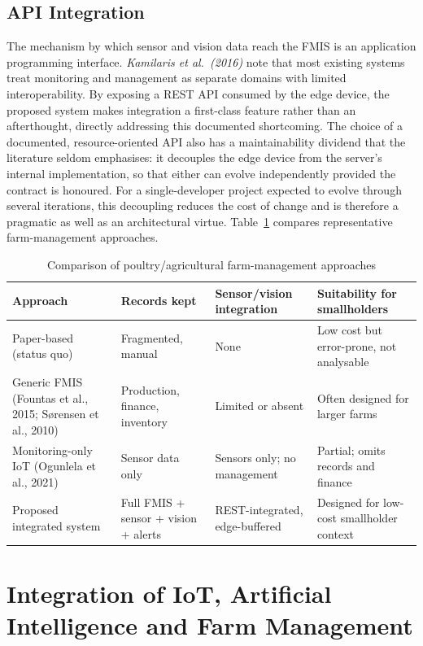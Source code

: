 \documentclass[12pt,a4paper]{report}
\begin{document}
\subsection{API Integration}

The mechanism by which sensor and vision data reach the FMIS is an application programming interface. \textit{Kamilaris et al.\ (2016)} note that most existing systems treat monitoring and management as separate domains with limited interoperability. By exposing a REST API consumed by the edge device, the proposed system makes integration a first-class feature rather than an afterthought, directly addressing this documented shortcoming. The choice of a documented, resource-oriented API also has a maintainability dividend that the literature seldom emphasises: it decouples the edge device from the server's internal implementation, so that either can evolve independently provided the contract is honoured. For a single-developer project expected to evolve through several iterations, this decoupling reduces the cost of change and is therefore a pragmatic as well as an architectural virtue. Table~\ref{tab:fmis} compares representative farm-management approaches.

\begin{table}[tbp]
\caption{Comparison of poultry/agricultural farm-management approaches}
\label{tab:fmis}
\centering
\small
\begin{tabularx}{\textwidth}{|X|X|X|X|}
\hline
\rowcolor{headerblue}
\textbf{Approach} & \textbf{Records kept} & \textbf{Sensor/vision integration} & \textbf{Suitability for smallholders} \\
\hline
Paper-based (status quo) & Fragmented, manual & None & Low cost but error-prone, not analysable \\
\hline
Generic FMIS (Fountas et al., 2015; S{\o}rensen et al., 2010) & Production, finance, inventory & Limited or absent & Often designed for larger farms \\
\hline
Monitoring-only IoT (Ogunlela et al., 2021) & Sensor data only & Sensors only; no management & Partial; omits records and finance \\
\hline
Proposed integrated system & Full FMIS + sensor + vision + alerts & REST-integrated, edge-buffered & Designed for low-cost smallholder context \\
\hline
\end{tabularx}
\end{table}

\section{Integration of IoT, Artificial Intelligence and Farm Management}
\end{document}
